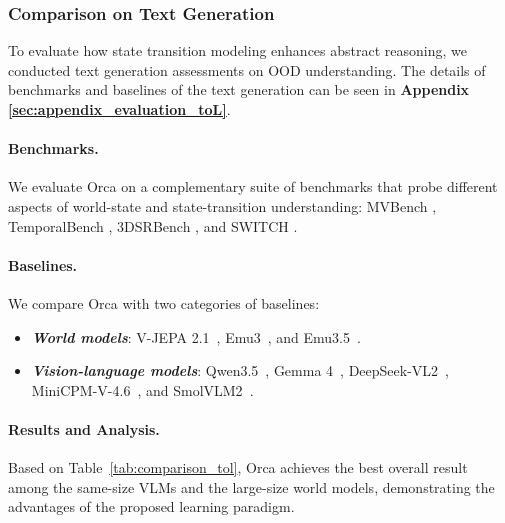 \subsubsection{Comparison on Text Generation}\label{sec:evaluation_toL}


To evaluate how state transition modeling enhances abstract reasoning, we conducted text generation assessments on OOD understanding.
The details of benchmarks and baselines of the text generation can be seen in \textbf{Appendix \ref{sec:appendix_evaluation_toL}}.

\paragraph{Benchmarks.} 
We evaluate Orca on a complementary suite of benchmarks that probe different aspects of world-state and state-transition understanding: 
MVBench \citep{MVBench}, TemporalBench \citep{cai2024temporalbench}, 3DSRBench \citep{ma20253dsrbench}, and SWITCH \citep{switch2025}.




\paragraph{Baselines.} We compare Orca with two categories of baselines:

\vspace{-2ex}
\begin{itemize}
    \item \textit{\textbf{World models}}: V-JEPA 2.1~\citep{V-JEPA-2.1}, Emu3~\citep{Emu3}, and Emu3.5~\citep{Emu35}.
    \item \textit{\textbf{Vision-language models}}: Qwen3.5~\citep{qwen35}, Gemma 4~\citep{Gemma4}, DeepSeek-VL2~\citep{DeepSeek-VL2}, MiniCPM-V-4.6~\citep{MiniCPM-o-4.5}, and SmolVLM2~\citep{SmolVLM}.
\end{itemize}




\paragraph{Results and Analysis.} 
Based on Table~\ref{tab:comparison_tol}, Orca achieves the best overall result among the same-size VLMs and the large-size world models, demonstrating the advantages of the proposed learning paradigm.

